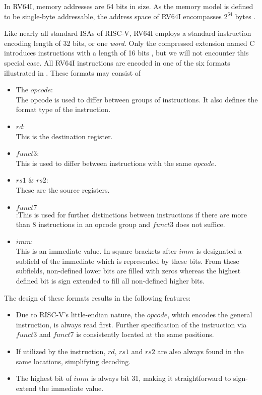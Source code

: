In RV64I, memory addresses are 64 bits in size. As the memory model
is defined to be single-byte addressable, the address space of RV64I
encompasses $2^{64}$ bytes \cite[Chapter 1.4]{riscv-isa}.

Like nearly all standard ISAs of RISC-V, RV64I employs a standard
instruction encoding length of 32 bits, or one \emph{word}. Only the
compressed extension named C introduces instructions with a length of
16 bits \cite[Chapter 1.5]{riscv-isa}, but we will not encounter this
special case. All RV64I instructions are encoded in one of the six
formats illustrated in . These formats may
consist of
\begin{itemize}
      \item The $opcode$:\\ The opcode is used to differ between groups of
            instructions. It also defines the format type of the instruction.
      \item $rd$:\\ This is the destination register.
      \item $funct3$:\\This is used to differ between instructions with the same
            $opcode$.
      \item $rs1$ \& $rs2$:\\ These are the source registers.
      \item $funct7$\\:This is used for further distinctions between instructions
            if there are more than 8 instructions in an opcode group and $funct3$
            does not suffice.
      \item $imm$:\\This is an immediate value. In square brackets after $imm$ is
            designated a subfield of the immediate which is represented by these
            bits. From these subfields, non-defined lower bits are filled with
            zeros whereas the highest defined bit is sign extended to fill all
            non-defined higher bits.
\end{itemize}



The design of these formats results in the following features:
\begin{itemize}
      \item Due to RISC-V's little-endian nature, the $opcode$, which encodes the
            general instruction, is always read first. Further specification of
            the instruction via $funct3$ and $funct7$ is consistently located at
            the same positions.
      \item If utilized by the instruction, $rd$, $rs1$ and $rs2$ are also always
            found in the same locations, simplifying decoding.
      \item The highest bit of $imm$ is always bit 31, making it straightforward
            to sign-extend the immediate value.
\end{itemize}

